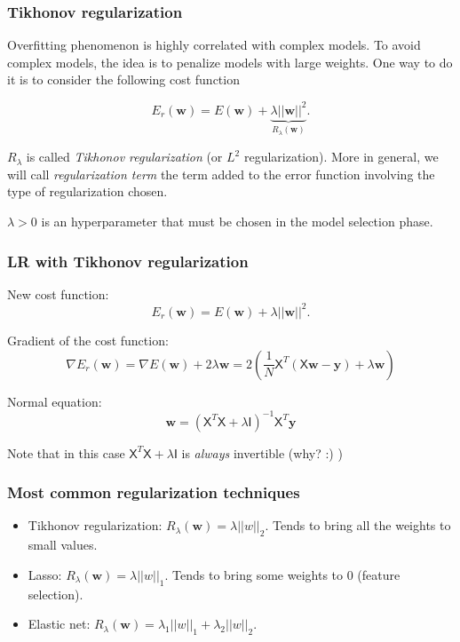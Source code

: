 \documentclass{beamer}
\begin{document}
	\begin{frame}
		\frametitle{Tikhonov regularization}
		
		Overfitting phenomenon is highly correlated with complex models. To avoid complex models, the idea is to penalize models with large weights. One way to do it is to consider the following cost function
		
	\vspace{5mm}
	
		\begin{equation*}
			E_{r}(\bm{w}) = E(\bm{w}) + \underbrace{\lambda ||\bm{w}||^2}_{R_{\lambda}(\bm{w})}.
		\end{equation*}
		
	\vspace{5mm}
	
	$R_{\lambda}$ is called \textsl{Tikhonov regularization} (or $L^2$ regularization). More in general, we will call \textsl{regularization term} the term added to the error function involving the type of regularization chosen.
	
	\vspace{5mm}
	
	$\lambda > 0$ is an hyperparameter that must be chosen in the model selection phase.
	\end{frame}

	\begin{frame}
		\frametitle{LR with Tikhonov regularization}
		New cost function:
		\begin{equation*}
			E_{r}(\bm{w}) = E(\bm{w}) + \lambda ||\bm{w}||^2.
		\end{equation*}
		
		Gradient of the cost function:
		\begin{equation*}
			\nabla E_r(\bm{w}) = \nabla E(\bm{w}) + 2 \lambda \bm{w} = 2(\frac{1}{N}\mathsf{X}^T(\mathsf{X}\bm{w} - \bm{y}) + \lambda \bm{w})
		\end{equation*}
	
		Normal equation:
		\begin{equation*}
			\bm{w} = (\mathsf{X}^T\mathsf{X} + \lambda \mathsf{I})^{-1}\mathsf{X}^T\bm{y}
		\end{equation*}
	
	Note that in this case $\mathsf{X}^T\mathsf{X} + \lambda \mathsf{I}$ is \textsl{always} invertible (why? :) )
	\end{frame}

	\begin{frame}
		\frametitle{Most common regularization techniques}
		\begin{itemize}
			\item Tikhonov regularization: $R_{\lambda}(\bm{w}) = \lambda ||w||_2$. Tends to bring all the weights to small values.
			\item Lasso: $R_{\lambda}(\bm{w}) = \lambda ||w||_1$. Tends to bring some weights to $0$ (feature selection).
			\item Elastic net: $R_{\lambda}(\bm{w}) = \lambda_1 ||w||_1 + \lambda_2 ||w||_2$.
		\end{itemize}
	\end{frame}
\end{document}

